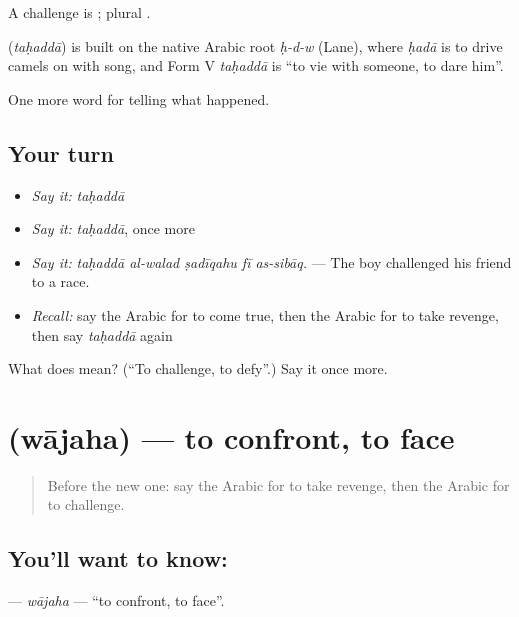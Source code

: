 A challenge is ; plural .

\begin{cousinweb}
\textbf{} (\emph{taḥaddā}) is built on the native Arabic root \emph{ḥ-d-w} (Lane), where \emph{ḥadā} is to drive camels on with song, and Form V \emph{taḥaddā} is \textquotedblleft{}to vie with someone, to dare him\textquotedblright{}.
\end{cousinweb}

\begin{grammarlens}[title={What you've built}]
One more word for telling what happened.
\end{grammarlens}

\subsection*{Your turn}
\begin{itemize}
\raggedright
  \item \emph{Say it:} \emph{taḥaddā}
  \item \emph{Say it:} \emph{taḥaddā}, once more
  \item \emph{Say it:} \emph{taḥaddā al-walad ṣadīqahu fī as-sibāq.} — The boy challenged his friend to a race.
  \item \emph{Recall:} say the Arabic for to come true, then the Arabic for to take revenge, then say \emph{taḥaddā} again
\end{itemize}

\begin{tcolorbox}[breakable,colback=teal!4,colframe=teal!35!black,title={Before you move on}]
What does  mean? (\textquotedblleft{}To challenge, to defy\textquotedblright{}.) Say it once more.
\end{tcolorbox}
\section[\texorpdfstring{\ar{واجه} (wājaha)}{واجه (wājaha)}]{ (wājaha) — to confront, to face}

\label{lesson:AR-C345-wajaha}



\begin{quote}
Before the new one: say the Arabic for to take revenge, then the Arabic for to challenge.
\end{quote}

\subsection*{You'll want to know: }
\textbf{} — \emph{wājaha} — \textquotedblleft{}to confront, to face\textquotedblright{}.

